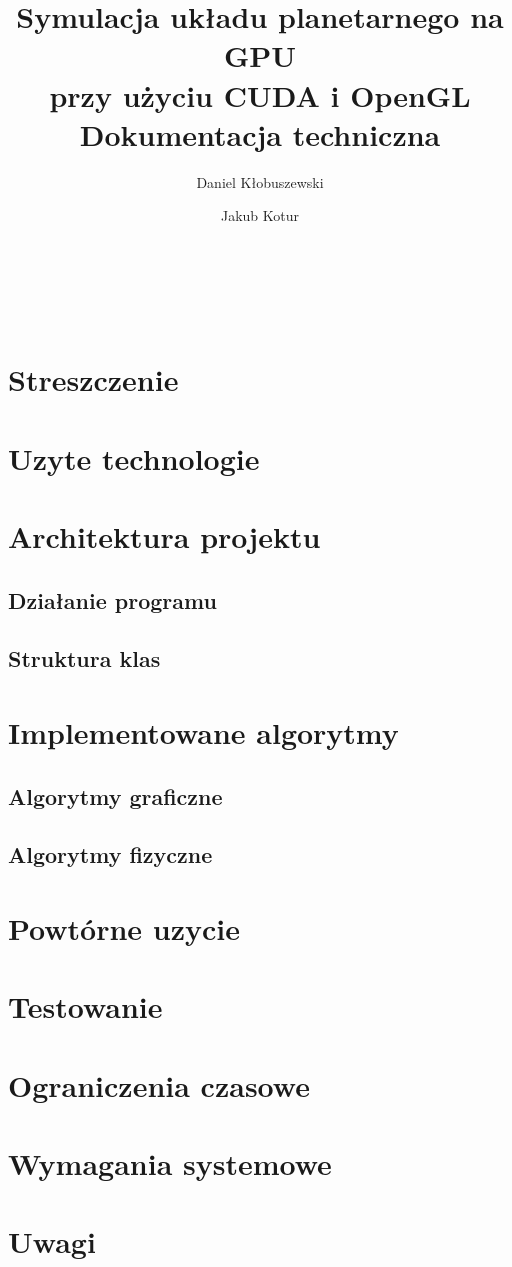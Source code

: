 \documentclass[a4paper,titlepage,10pt]{article}
\title{\huge Symulacja układu planetarnego na GPU\\ przy użyciu CUDA i OpenGL\\\small Dokumentacja techniczna}
\author{Daniel Kłobuszewski\and Jakub Kotur}
\begin{document}
	\maketitle
	
	\pagestyle{fancyplain}
	\cfoot{\thepage/\pageref{LastPage}}

	\hfill \\
	
	\hfill \\
	

	\newpage

	\tableofcontents
	\newpage

	\section{Streszczenie}\label{sec:streszczenie}
	
	\section{Uzyte technologie}\label{sec:uzyte technologie}
	
	\section{Architektura projektu}\label{sec:architektura projektu}
	\subsection{Działanie programu}\label{sub:dzialanie programu}
	
	\subsection{Struktura klas}\label{sub:struktura klas}
	
	\section{Implementowane algorytmy}\label{sec:implementowane algorytmy}
	\subsection{Algorytmy graficzne}\label{sub:algorytmy graficzne}
	
	\subsection{Algorytmy fizyczne}\label{sub:algorytmy fizyczne}
	
	\section{Powtórne uzycie}\label{sec:powtorne uzycie}
	
	\section{Testowanie}\label{sec:testy}
	
	\section{Ograniczenia czasowe}\label{sec:ograniczenia czasowe}
	
	\section{Wymagania systemowe}\label{sec:wymagania systemowe}
	
	\section{Uwagi}\label{sec:uwagi}
	
\end{document}
